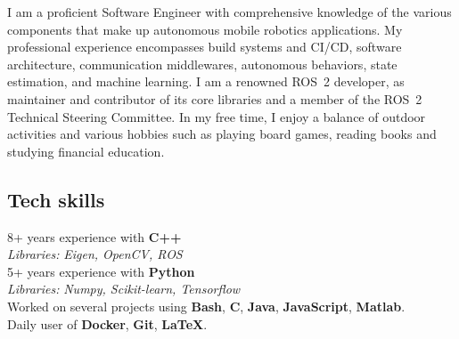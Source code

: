 \documentclass[letterpaper]{soragna-onepage-twocols} %
\begin{document}
\begin{minipage}[t]{0.3\textwidth} %



I am a proficient Software Engineer with comprehensive knowledge of the various components that make up autonomous mobile robotics applications.
My professional experience encompasses build systems and CI/CD, software architecture, communication middlewares, autonomous behaviors, state estimation, and machine learning.
I am a renowned ROS~2 developer, as maintainer and contributor of its core libraries and a member of the ROS~2 Technical Steering Committee.
In my free time, I enjoy a balance of outdoor activities and various hobbies such as playing board games, reading books and studying financial education.

\sectionspace %




\vspace{-12pt} %
\sectionspace %



\subsection{Tech skills}

8+ years experience with \textbf{C++}\\
{\emph{Libraries:} \small\emph{Eigen, OpenCV, ROS}}\\
5+ years experience with \textbf{Python}\\
{\emph{Libraries:} \small\emph{Numpy, Scikit-learn, Tensorflow}}\\
Worked on several projects using \textbf{Bash}, \textbf{C}, \textbf{Java}, \textbf{JavaScript},  \textbf{Matlab}.\\
Daily user of \textbf{Docker}, \textbf{Git}, \textbf{LaTeX}.\\


\end{minipage}
\end{document}
